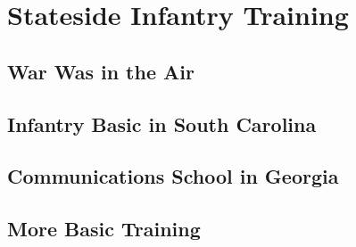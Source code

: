 



\frontmatter
% 



\clearpage{\thispagestyle{empty}\cleardoublepage}
\renewcommand{\cftpartaftersnumb}{\hspace{.5em}}
\renewcommand{\cftchaptername}{\hspace{1em}}
\renewcommand\cftchapteraftersnumb{\normalfont}
\renewcommand\cftbeforechapterskip{5pt plus 1pt}
\tableofcontents

\mainmatter
\graphicspath{{\subfix{./images/}}}

\part{Stateside Infantry Training}\label{stateside-infantry-training}
\chapter{War Was in the Air}\label{war-in-the-air}


\chapter{Infantry Basic in South Carolina}\label{infantry-basic}


\chapter{Communications School in Georgia}\label{communications-school}


\chapter{More Basic Training}\label{more-basic-training}



